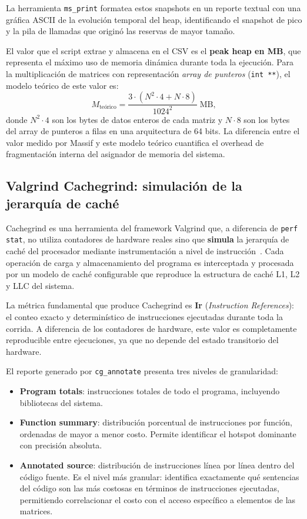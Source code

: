 La herramienta \texttt{ms\_print} formatea estos snapshots en un reporte textual
con una gráfica ASCII de la evolución temporal del heap, identificando el snapshot
de pico y la pila de llamadas que originó las reservas de mayor tamaño.

El valor que el script extrae y almacena en el CSV es el \textbf{peak heap en MB},
que representa el máximo uso de memoria dinámica durante toda la ejecución.
Para la multiplicación de matrices con representación \textit{array de punteros}
(\texttt{int~**}), el modelo teórico de este valor es:
\begin{equation}
    M_{\text{teórico}} = \frac{3 \cdot \left(N^2 \cdot 4 + N \cdot 8\right)}{1024^2}
    \;\text{MB},
\end{equation}
donde $N^2 \cdot 4$ son los bytes de datos enteros de cada matriz y $N \cdot 8$
son los bytes del array de punteros a filas en una arquitectura de 64 bits.
La diferencia entre el valor medido por Massif y este modelo teórico cuantifica el
overhead de fragmentación interna del asignador de memoria del sistema.


\subsection{Valgrind Cachegrind: simulación de la jerarquía de caché}

Cachegrind es una herramienta del framework Valgrind que, a diferencia de
\texttt{perf stat}, no utiliza contadores de hardware reales sino que
\textbf{simula} la jerarquía de caché del procesador mediante instrumentación
a nivel de instrucción~\parencite{nethercote2007valgrind}.
Cada operación de carga y almacenamiento del programa es interceptada y procesada
por un modelo de caché configurable que reproduce la estructura de caché L1, L2
y LLC del sistema.

La métrica fundamental que produce Cachegrind es \textbf{Ir}
(\textit{Instruction References}): el conteo exacto y determinístico de
instrucciones ejecutadas durante toda la corrida.
A diferencia de los contadores de hardware, este valor es completamente
reproducible entre ejecuciones, ya que no depende del estado transitorio del
hardware.

El reporte generado por \texttt{cg\_annotate} presenta tres niveles de
granularidad:

\begin{itemize}
    \item \textbf{Program totals}: instrucciones totales de todo el programa,
        incluyendo bibliotecas del sistema.
    \item \textbf{Function summary}: distribución porcentual de instrucciones por
        función, ordenadas de mayor a menor costo.
        Permite identificar el hotspot dominante con precisión absoluta.
    \item \textbf{Annotated source}: distribución de instrucciones línea por
        línea dentro del código fuente.
        Es el nivel más granular: identifica exactamente qué sentencias del código
        son las más costosas en términos de instrucciones ejecutadas, permitiendo
        correlacionar el costo con el acceso específico a elementos de las matrices.
\end{itemize}

